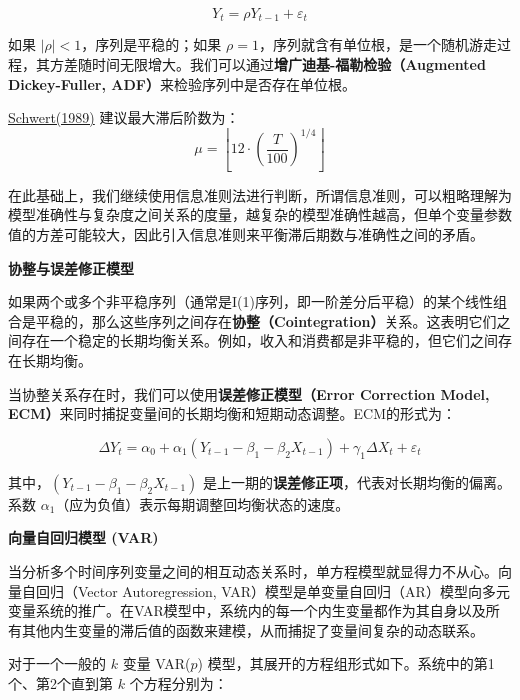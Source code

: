 \begin{equation}
	Y_t = \rho Y_{t-1} + \varepsilon_t
\end{equation}

如果 $|\rho|<1$，序列是平稳的；如果 $\rho=1$，序列就含有单位根，是一个随机游走过程，其方差随时间无限增大。我们可以通过\textbf{增广迪基-福勒检验（Augmented Dickey-Fuller, ADF）}来检验序列中是否存在单位根。

\href{https://doi.org/10.1080/07350015.1989.10509723}{Schwert(1989)}
建议最大滞后阶数为：  
\begin{equation}
  \mu = \left\lfloor 12 \cdot \left( \frac{T}{100} \right)^{1/4} \right\rfloor  
\end{equation}

在此基础上，我们继续使用信息准则法进行判断，所谓信息准则，可以粗略理解为模型准确性与复杂度之间关系的度量，越复杂的模型准确性越高，但单个变量参数值的方差可能较大，因此引入信息准则来平衡滞后期数与准确性之间的矛盾。

\textbf{协整与误差修正模型}

如果两个或多个非平稳序列（通常是I(1)序列，即一阶差分后平稳）的某个线性组合是平稳的，那么这些序列之间存在\textbf{协整（Cointegration）}关系。这表明它们之间存在一个稳定的长期均衡关系。例如，收入和消费都是非平稳的，但它们之间存在长期均衡。

当协整关系存在时，我们可以使用\textbf{误差修正模型（Error Correction Model, ECM）}来同时捕捉变量间的长期均衡和短期动态调整。ECM的形式为：

\begin{equation}
\Delta Y_t = \alpha_0 + \alpha_1 (Y_{t-1} - \beta_1 - \beta_2 X_{t-1}) + \gamma_1 \Delta X_t + \varepsilon_t
\end{equation}

其中，$(Y_{t-1} - \beta_1 - \beta_2 X_{t-1})$ 是上一期的\textbf{误差修正项}，代表对长期均衡的偏离。系数 $\alpha_1$（应为负值）表示每期调整回均衡状态的速度。

\textbf{向量自回归模型 (VAR)}

当分析多个时间序列变量之间的相互动态关系时，单方程模型就显得力不从心。向量自回归（Vector Autoregression, VAR）模型是单变量自回归（AR）模型向多元变量系统的推广。在VAR模型中，系统内的每一个内生变量都作为其自身以及所有其他内生变量的滞后值的函数来建模，从而捕捉了变量间复杂的动态联系。

对于一个一般的 $k$ 变量 VAR($p$) 模型，其展开的方程组形式如下。系统中的第1个、第2个直到第 $k$ 个方程分别为：


